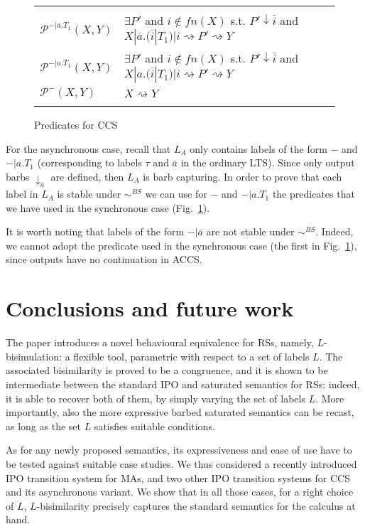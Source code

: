 \documentclass[copyright,creativecommons]{eptcs}
\newcommand{\bsbis}{\sim^{BS}}
\newcommand{\react}{\rightsquigarrow}
\newcommand{\<}{\langle}
\renewcommand{\>}{\rangle}
\begin{document}
\begin{figure}
\begin{tabular}{p{3 cm} p{12.1 cm}}
\hline
\\
$ \mathcal P^{-|\bar{a}.T_1}(X,Y)$ & $\exists P'$ and $i\notin fn(X)$  s.t.
  $P'\downarrow \bar{i}$ and $X|\bar{a}.(\bar{i}|T_1) | i \react
  P' \react Y$ \\
  $\mathcal P^{-|a.T_1}(X,Y)$ & $\exists P'$ and $i\notin fn(X)$  s.t.
  $P'\downarrow \bar{i}$ and $X|a.(\bar{i}|T_1) | i \react
  P' \react Y$ \\
  $\mathcal P^-(X,Y)$ & $X \react Y$ \\ \\
\hline
\end{tabular}
\caption{Predicates for CCS}\label{fig:arrayCCS}
\end{figure}

For the asynchronous case, recall that $L_A$ only contains labels of
the form $-$ and $-|a.T_1$ (corresponding to labels $\tau$ and
$\bar{a}$ in the ordinary LTS). Since only output barbs
$\downarrow_{\bar{a}}$ are defined, then $L_A$ is barb capturing. In
order to prove that each label in $L_A$ is stable under $\bsbis$ we
can use for $-$ and $-|a.T_1$ the predicates that we have used in
the synchronous case (Fig.~\ref{fig:arrayCCS}).

It is worth noting that labels of the form $-|\bar{a}$ are not
stable under $\bsbis$. Indeed, we cannot adopt the predicate used in
the synchronous case (the first in Fig.~\ref{fig:arrayCCS}), since
outputs have no continuation in ACCS.



\section{Conclusions and future work}
\label{sec:Concl}

The paper introduces a novel behavioural equivalence for RSs, namely,
$L$-bisimulation: a flexible tool, parametric with respect to a set of
labels $L$. The associated bisimilarity is proved to be a
congruence, and it is shown to be intermediate between the standard
IPO and saturated semantics for RSs: indeed, it is able to recover
both of them, by simply varying the set of labels $L$. More
importantly, also the more expressive barbed saturated semantics can
be recast, as long as the set $L$ satisfies suitable conditions.

As for any newly proposed semantics, its expressiveness and ease of
use have to be tested against suitable case studies. We thus
considered a recently introduced IPO transition system for
MAs, and two other IPO transition systems for CCS and its asynchronous
variant. We show that in all those cases, for a right choice of $L$,
$L$-bisimilarity precisely captures the standard semantics for the calculus at hand.
\end{document}
